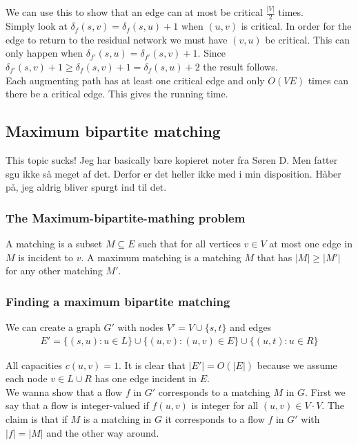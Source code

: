 \documentclass[12pt]{article}
\begin{document}
We can use this to show that an edge can at most be critical $\frac{|V|}{2}$ times. \\

Simply look at $\delta_f(s, v) = \delta_f(s, u) +1$ when $(u, v)$ is critical. In order for the edge to return to the residual network we must have $(v, u)$ be critical. This can only happen when $\delta_{f'}(s, u) = \delta_{f'}(s, v) + 1$. Since $\delta_{f'}(s, v) + 1 \geq \delta_f(s, v) + 1 = \delta_f(s, u) +2$ the result follows. \\

Each augmenting path has at least one critical edge and only $O(VE)$ times can there be a critical edge. This gives the running time. 
%
\subsection{Maximum bipartite matching}
This topic sucks! Jeg har basically bare kopieret noter fra Søren D. Men fatter sgu ikke så meget af det. Derfor er det heller ikke med i min disposition. Håber på, jeg aldrig bliver spurgt ind til det. 

\subsubsection{The Maximum-bipartite-mathing problem}
A matching is a subset $M \subseteq E$ such that for all vertices $v \in V$ at most one edge in $M$ is incident to $v$. A maximum matching is a matching $M$ that has $|M| \geq |M'|$ for any other matching $M'$.
%
\subsubsection{Finding a maximum bipartite matching}
We can create a graph $G'$ with nodes $V' = V \cup \{s, t\}$ and edges
\begin{align*}
E' = \{(s, u) : u \in L\} \cup \{(u, v) : (u, v) \in E \} \cup \{(u, t) : u \in R\}
\end{align*}

All capacities $c(u, v) = 1$. It is clear that $|E'| = O(|E|)$ because we assume each node $v \in L \cup R$ has one edge incident in $E$. \\

We wanna show that a flow $f$ in $G'$ corresponds to a matching $M$ in $G$. First we say that a flow is integer-valued if $f(u,v)$ is integer for all $(u,v) \in V 	\cdot V$. The claim is that if $M$ is a matching in $G$ it corresponds to a flow $f$ in $G'$ with $|f| = |M|$ and the other way around.\\
\end{document}
